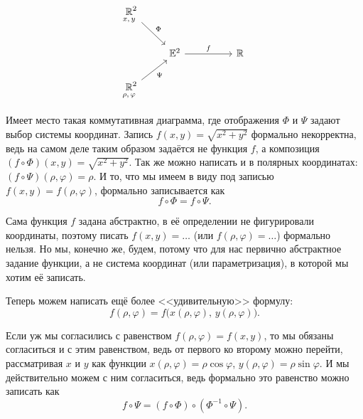 %
\[\begin{tikzcd}
	{\underset{\mathclap{x,\,y}}{\mathbb{R}}^2} \\
	& {\mathbb{E}^2} && {\mathbb{R}} \\
	{\underset{\mathclap{\rho,\,\varphi}}{\mathbb{R}}^2}
	\arrow["\Phi", from=1-1, to=2-2]
	\arrow["f", from=2-2, to=2-4]
	\arrow["\Psi"', from=3-1, to=2-2]
\end{tikzcd}\]
%

Имеет место такая коммутативная диаграмма, где отображения $\Phi$ и $\Psi$ задают выбор системы координат. Запись $f(x, y) = \sqrt{x^2 + y^2}$ формально некорректна, ведь на самом деле таким образом задаётся не функция $f$, а композиция $(f \circ \Phi)(x, y) = \sqrt{x^2 + y^2}$. Так же можно написать и в полярных координатах: $(f \circ \Psi)(\rho, \varphi) = \rho$. И то, что мы имеем в виду под записью $f(x, y) = f(\rho, \varphi)$, формально записывается как
\[
	f \circ \Phi = f \circ \Psi.
\]

Сама функция $f$ задана абстрактно, в её определении не фигурировали координаты, поэтому писать $f(x, y) = \ldots$ (или $f(\rho, \varphi) = \ldots$) формально нельзя. Но мы, конечно же, будем, потому что для нас первично абстрактное задание функции, а не система координат (или параметризация), в которой мы хотим её записать.

Теперь можем написать ещё более <<удивительную>> формулу:
\[
	f(\rho, \varphi) = f\big(x(\rho, \varphi),\,y(\rho, \varphi)\big).
\]

Если уж мы согласились с равенством $f(\rho, \varphi) = f(x, y)$, то мы обязаны согласиться и с этим равенством, ведь от первого ко второму можно перейти, рассматривая $x$ и $y$ как функции $x(\rho, \varphi) = \rho\cos\varphi$, $y(\rho, \varphi) = \rho\sin\varphi$. И мы действительно можем с ним согласиться, ведь формально это равенство можно записать как
\[
	f \circ \Psi = (f \circ \Phi) \circ (\Phi^{-1} \circ \Psi).
\]

